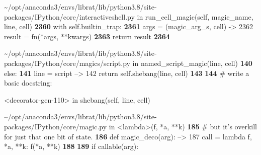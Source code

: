 \documentclass[letterpaper,10pt,english]{sphinxmanual}
\begin{document}
{\begin{sphinxVerbatim}[commandchars=\\\{\}]
\textcolor{ansi-green}{\textasciitilde{}/opt/anaconda3/envs/librat/lib/python3.8/site-packages/IPython/core/interactiveshell.py} in \textcolor{ansi-cyan}{run\_cell\_magic}\textcolor{ansi-blue}{(self, magic\_name, line, cell)}
\textcolor{ansi-green-intense}{\textbf{   2360}}             \textcolor{ansi-green}{with} self\textcolor{ansi-blue}{.}builtin\_trap\textcolor{ansi-blue}{:}
\textcolor{ansi-green-intense}{\textbf{   2361}}                 args \textcolor{ansi-blue}{=} \textcolor{ansi-blue}{(}magic\_arg\_s\textcolor{ansi-blue}{,} cell\textcolor{ansi-blue}{)}
\textcolor{ansi-green}{-> 2362}\textcolor{ansi-red}{                 }result \textcolor{ansi-blue}{=} fn\textcolor{ansi-blue}{(}\textcolor{ansi-blue}{*}args\textcolor{ansi-blue}{,} \textcolor{ansi-blue}{**}kwargs\textcolor{ansi-blue}{)}
\textcolor{ansi-green-intense}{\textbf{   2363}}             \textcolor{ansi-green}{return} result
\textcolor{ansi-green-intense}{\textbf{   2364}}

\textcolor{ansi-green}{\textasciitilde{}/opt/anaconda3/envs/librat/lib/python3.8/site-packages/IPython/core/magics/script.py} in \textcolor{ansi-cyan}{named\_script\_magic}\textcolor{ansi-blue}{(line, cell)}
\textcolor{ansi-green-intense}{\textbf{    140}}             \textcolor{ansi-green}{else}\textcolor{ansi-blue}{:}
\textcolor{ansi-green-intense}{\textbf{    141}}                 line \textcolor{ansi-blue}{=} script
\textcolor{ansi-green}{--> 142}\textcolor{ansi-red}{             }\textcolor{ansi-green}{return} self\textcolor{ansi-blue}{.}shebang\textcolor{ansi-blue}{(}line\textcolor{ansi-blue}{,} cell\textcolor{ansi-blue}{)}
\textcolor{ansi-green-intense}{\textbf{    143}}
\textcolor{ansi-green-intense}{\textbf{    144}}         \textcolor{ansi-red}{\# write a basic docstring:}

\textcolor{ansi-green}{<decorator-gen-110>} in \textcolor{ansi-cyan}{shebang}\textcolor{ansi-blue}{(self, line, cell)}

\textcolor{ansi-green}{\textasciitilde{}/opt/anaconda3/envs/librat/lib/python3.8/site-packages/IPython/core/magic.py} in \textcolor{ansi-cyan}{<lambda>}\textcolor{ansi-blue}{(f, *a, **k)}
\textcolor{ansi-green-intense}{\textbf{    185}}     \textcolor{ansi-red}{\# but it's overkill for just that one bit of state.}
\textcolor{ansi-green-intense}{\textbf{    186}}     \textcolor{ansi-green}{def} magic\_deco\textcolor{ansi-blue}{(}arg\textcolor{ansi-blue}{)}\textcolor{ansi-blue}{:}
\textcolor{ansi-green}{--> 187}\textcolor{ansi-red}{         }call \textcolor{ansi-blue}{=} \textcolor{ansi-green}{lambda} f\textcolor{ansi-blue}{,} \textcolor{ansi-blue}{*}a\textcolor{ansi-blue}{,} \textcolor{ansi-blue}{**}k\textcolor{ansi-blue}{:} f\textcolor{ansi-blue}{(}\textcolor{ansi-blue}{*}a\textcolor{ansi-blue}{,} \textcolor{ansi-blue}{**}k\textcolor{ansi-blue}{)}
\textcolor{ansi-green-intense}{\textbf{    188}}
\textcolor{ansi-green-intense}{\textbf{    189}}         \textcolor{ansi-green}{if} callable\textcolor{ansi-blue}{(}arg\textcolor{ansi-blue}{)}\textcolor{ansi-blue}{:}


\end{sphinxVerbatim}}
\end{document}
